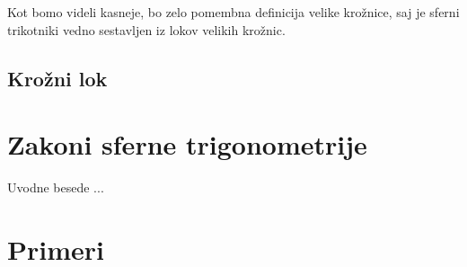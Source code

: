 Kot bomo videli kasneje, bo zelo pomembna definicija velike krožnice, saj je sferni trikotniki vedno sestavljen iz lokov velikih krožnic.

\subsection{Krožni lok}  

\section{Zakoni sferne trigonometrije}

Uvodne besede ...


\section{Primeri}